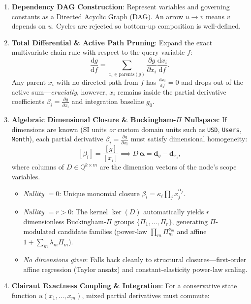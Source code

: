 \documentclass[11pt,a4paper]{article}
\newcommand{\dd}{\mathrm{d}}
\newcommand{\pd}[2]{\frac{\partial #1}{\partial #2}}
\newcommand{\td}[2]{\frac{\dd #1}{\dd #2}}
\newcommand{\dimbr}[1]{\left[#1\right]}
\begin{document}
\begin{enumerate}[leftmargin=1.5em,itemsep=4pt]
  \item \textbf{Dependency DAG Construction}: Represent variables and governing constants as a Directed Acyclic Graph (DAG). An arrow $u \to v$ means $v$ depends on $u$. Cycles are rejected so bottom-up composition is well-defined.
  \item \textbf{Total Differential \& Active Path Pruning}: Expand the exact multivariate chain rule with respect to the query variable $f$:
  \begin{equation}
    \td{g}{f} = \sum_{x_i \in \text{parents}(g)} \pd{g}{x_i}\td{x_i}{f}.
  \end{equation}
  Any parent $x_i$ with no directed path from $f$ has $\td{x_i}{f} = 0$ and drops out of the active sum—\emph{crucially}, however, $x_i$ remains inside the partial derivative coefficients $\beta_i = \pd{g}{x_i}$ and integration baseline $g_0$.
  \item \textbf{Algebraic Dimensional Closure \& Buckingham-$\Pi$ Nullspace}: If dimensions are known (SI units \emph{or} custom domain units such as \texttt{USD}, \texttt{Users}, \texttt{Month}), each partial derivative $\beta_i = \pd{g}{x_i}$ must satisfy dimensional homogeneity:
  \begin{equation}
    \dimbr{\beta_i} = \frac{\dimbr{g}}{\dimbr{x_i}} \implies D\,\boldsymbol{\alpha} = \mathbf{d}_g - \mathbf{d}_{x_i},
  \end{equation}
  where columns of $D \in \mathbb{Q}^{k\times m}$ are the dimension vectors of the node's scope variables.
  \begin{itemize}[leftmargin=1.4em]
    \item \emph{Nullity $= 0$}: Unique monomial closure $\beta_i = \kappa_i \prod_j x_j^{\alpha_j}$.
    \item \emph{Nullity $= r > 0$}: The kernel $\ker(D)$ automatically yields $r$ dimensionless Buckingham-$\Pi$ groups $\{\Pi_1,\dots,\Pi_r\}$, generating $\Pi$-modulated candidate families (power-law $\prod_m \Pi_m^{\nu_m}$ and affine $1 + \sum_m \lambda_m \Pi_m$).
    \item \emph{No dimensions given}: Falls back cleanly to structural closures—first-order affine regression (Taylor ansatz) and constant-elasticity power-law scaling.
  \end{itemize}
  \item \textbf{Clairaut Exactness Coupling \& Integration}: For a conservative state function $u(x_1,\dots,x_m)$, mixed partial derivatives must commute:

\end{enumerate}
\end{document}
